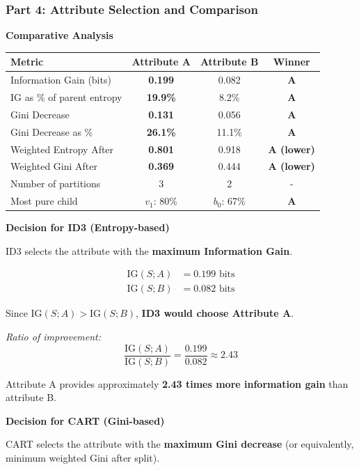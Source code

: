 \documentclass[12pt]{article}
\begin{document}
\subsubsection{Part 4: Attribute Selection and Comparison}

\begin{solution}
\textbf{Comparative Analysis}

\begin{center}
\begin{tabular}{|l|c|c|c|}
\hline
\textbf{Metric} & \textbf{Attribute A} & \textbf{Attribute B} & \textbf{Winner} \\
\hline
Information Gain (bits) & \textbf{0.199} & 0.082 & \textbf{A} \\
IG as \% of parent entropy & \textbf{19.9\%} & 8.2\% & \textbf{A} \\
Gini Decrease & \textbf{0.131} & 0.056 & \textbf{A} \\
Gini Decrease as \% & \textbf{26.1\%} & 11.1\% & \textbf{A} \\
Weighted Entropy After & \textbf{0.801} & 0.918 & \textbf{A (lower)} \\
Weighted Gini After & \textbf{0.369} & 0.444 & \textbf{A (lower)} \\
Number of partitions & 3 & 2 & - \\
Most pure child & $v_1$: 80\% & $b_0$: 67\% & \textbf{A} \\
\hline
\end{tabular}
\end{center}

\textbf{Decision for ID3 (Entropy-based)}

ID3 selects the attribute with the \textbf{maximum Information Gain}.

\begin{align*}
\text{IG}(S; A) &= 0.199 \text{ bits} \\
\text{IG}(S; B) &= 0.082 \text{ bits}
\end{align*}

Since $\text{IG}(S; A) > \text{IG}(S; B)$, \textbf{ID3 would choose Attribute A}.

\textit{Ratio of improvement:}
\[
\frac{\text{IG}(S; A)}{\text{IG}(S; B)} = \frac{0.199}{0.082} \approx 2.43
\]

Attribute A provides approximately \textbf{2.43 times more information gain} than attribute B.

\textbf{Decision for CART (Gini-based)}

CART selects the attribute with the \textbf{maximum Gini decrease} (or equivalently, minimum weighted Gini after split).


\end{solution}
\end{document}
